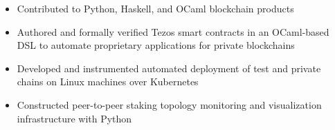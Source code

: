 \documentclass[10pt,a4paper]{altacv}
\newenvironment{tightitemize} %
{\vspace{-\topsep}\begin{itemize}\itemsep1pt \parskip0pt \parsep0pt}
{\end{itemize}\vspace{-\topsep}}
\begin{document}

\begin{fullwidth}
\makecvheader
\end{fullwidth}



\vspace{\topsep} %
\begin{tightitemize}
    \item Contributed to Python, Haskell, and OCaml blockchain products
    \item Authored and formally verified Tezos smart contracts in an OCaml-based 
        DSL to automate proprietary applications for private blockchains
    \item Developed and instrumented automated deployment of test and private 
        chains on Linux machines over Kubernetes
    \item Constructed peer-to-peer staking topology monitoring and visualization 
        infrastructure with Python
\end{tightitemize}
\end{document}
